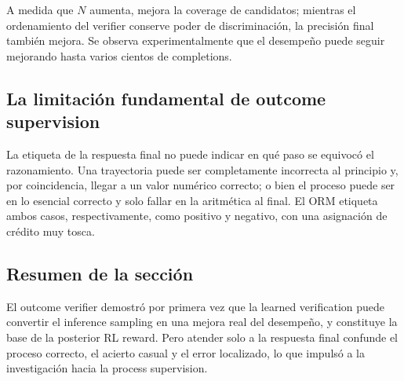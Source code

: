 A medida que $N$ aumenta, mejora la coverage de candidatos; mientras el ordenamiento del verifier conserve poder de discriminación, la precisión final también mejora. Se observa experimentalmente que el desempeño puede seguir mejorando hasta varios cientos de completions.


\subsection{La limitación fundamental de outcome supervision}

La etiqueta de la respuesta final no puede indicar en qué paso se equivocó el razonamiento. Una trayectoria puede ser completamente incorrecta al principio y, por coincidencia, llegar a un valor numérico correcto; o bien el proceso puede ser en lo esencial correcto y solo fallar en la aritmética al final. El ORM etiqueta ambos casos, respectivamente, como positivo y negativo, con una asignación de crédito muy tosca.

\subsection{Resumen de la sección}

El outcome verifier demostró por primera vez que la learned verification puede convertir el inference sampling en una mejora real del desempeño, y constituye la base de la posterior RL reward. Pero atender solo a la respuesta final confunde el proceso correcto, el acierto casual y el error localizado, lo que impulsó a la investigación hacia la process supervision.
